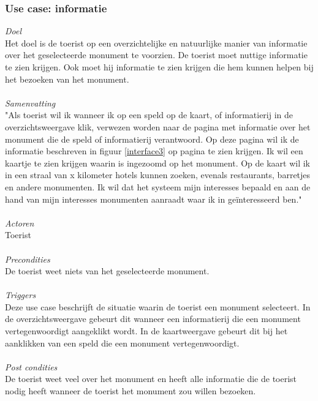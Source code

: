 \documentclass[a4paper,10pt]{article}
\begin{document}
			\subsubsection{Use case: informatie}
			\textit{Doel}\\
			Het doel is de toerist op een overzichtelijke en natuurlijke manier van informatie over het geselecteerde monument te voorzien. De toerist moet nuttige informatie te zien krijgen. Ook moet hij informatie te zien krijgen die hem kunnen helpen bij het bezoeken van het monument.\\ \\
			\textit{Samenvatting}\\
			"Als toerist wil ik wanneer ik op een speld op de kaart, of informatierij in de overzichtsweergave klik, verwezen worden naar de pagina met informatie over het monument die de speld of informatierij verantwoord. Op deze pagina wil ik de informatie beschreven in figuur \ref{interface3} op pagina \pageref{interface3} te zien krijgen. Ik wil een kaartje te zien krijgen waarin is ingezoomd op het monument. Op de kaart wil ik in een straal van x kilometer hotels kunnen zoeken, evenals restaurants, barretjes en andere monumenten. Ik wil dat het systeem mijn interesses bepaald en aan de hand van mijn interesses monumenten aanraadt waar ik in ge\"interesseerd ben."\\ \\
			\textit{Actoren}\\
			Toerist\\ \\
			\textit{Precondities}\\
			De toerist weet niets van het geselecteerde monument.\\ \\
			\textit{Triggers}\\
			Deze use case beschrijft de situatie waarin de toerist een monument selecteert. In de overzichtsweergave gebeurt dit wanneer een informatierij die een monument vertegenwoordigt aangeklikt wordt. In de kaartweergave gebeurt dit bij het aanklikken van een speld die een monument vertegenwoordigt.\\ \\
			\textit{Post condities}\\
			De toerist weet veel over het monument en heeft alle informatie die de toerist nodig heeft wanneer de toerist het monument zou willen bezoeken.	
			
\end{document}

